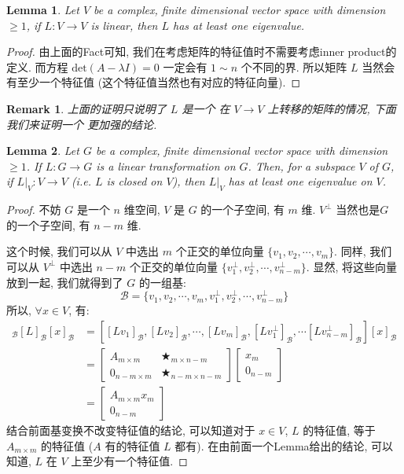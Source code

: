\documentclass{article}
\newtheorem{lemma}{Lemma}
\newtheorem{remark}{Remark}
\begin{document}
\begin{lemma}
  Let $V$ be a complex, finite dimensional vector space with dimension $\geq 1$,
  if $L: V\to V$ is linear, then $L$ has at least one eigenvalue.
\end{lemma}
\begin{proof}
  由上面的Fact可知, 我们在考虑矩阵的特征值时不需要考虑inner product的定义.
  而方程 $\mathrm{det}(A - \lambda I) = 0$ 一定会有 $1\sim n$ 个不同的界.
  所以矩阵 $L$ 当然会有至少一个特征值 (这个特征值当然也有对应的特征向量).
\end{proof}
\begin{remark}
  上面的证明只说明了 $L$ 是一个 在 $V\to V$ 上转移的矩阵的情况, 下面我们来证明一个
  更加强的结论.
\end{remark}
\begin{lemma}
  Let $G$ be a complex, finite dimensional vector space with dimension $\geq 1$.
  If $L:G\to G$ is a linear transformation on $G$.
  Then, for a subspace $V$ of $G$, if $L|_V: V\to V$ (i.e. $L$ is closed on $V$),
  then $L|_V$ has at least one eigenvalue on $V$.
\end{lemma}
\begin{proof}
  不妨 $G$ 是一个 $n$ 维空间,  $V$ 是 $G$ 的一个子空间, 有 $m$ 维.
  $V^\perp$ 当然也是$G$ 的一个子空间, 有 $n - m$ 维.

  这个时候, 我们可以从 $V$ 中选出 $m$ 个正交的单位向量 $\{v_1, v_2, \cdots, v_m\}$.
  同样, 我们可以从 $V^\perp$ 中选出 $n-m$ 个正交的单位向量 $\{v_1^\perp, v_2^\perp, \cdots, v_{n-m}^\perp\}$. 显然, 将这些向量放到一起, 我们就得到了 $G$ 的一组基:
  \[\mathcal{B} = \{v_1, v_2, \cdots, v_m, v_1^\perp, v_2^\perp, \cdots, v_{n-m}^\perp\}\]
  所以, $\forall x\in V$, 有:
  \begin{align*}
    _{\mathcal{B}}[L]_{\mathcal{B}}[x]_{\mathcal{B}}
    &= [[Lv_1]_{\mathcal{B}}, [Lv_2]_{\mathcal{B}}, \cdots, [Lv_m]_{\mathcal{B}}, [Lv_1^\perp]_{\mathcal{B}}, \cdots [Lv_{n-m}^\perp]_{\mathcal{B}}][x]_{\mathcal{B}} \\
    &= \left[
      \begin{array}{cc}
        A_{m\times m}& \bigstar_{m\times n-m} \\
        0_{n-m\times m} & \bigstar_{n-m\times n-m}
      \end{array}
      \right] \left[
        \begin{array}{c}
          x_m \\
          0_{n-m}
        \end{array}
    \right] \\
    &= \left[
      \begin{array}{c}
        A_{m\times m} x_m \\
        0_{n-m}
      \end{array}
      \right]
    \end{align*}
    结合前面基变换不改变特征值的结论, 可以知道对于 $x \in V$,
    $L$  的特征值, 等于 $A_{m\times m}$ 的特征值 ($A$ 有的特征值 $L$ 都有).
    在由前面一个Lemma给出的结论, 可以知道, $L$ 在 $V$ 上至少有一个特征值.
\end{proof}
\end{document}
